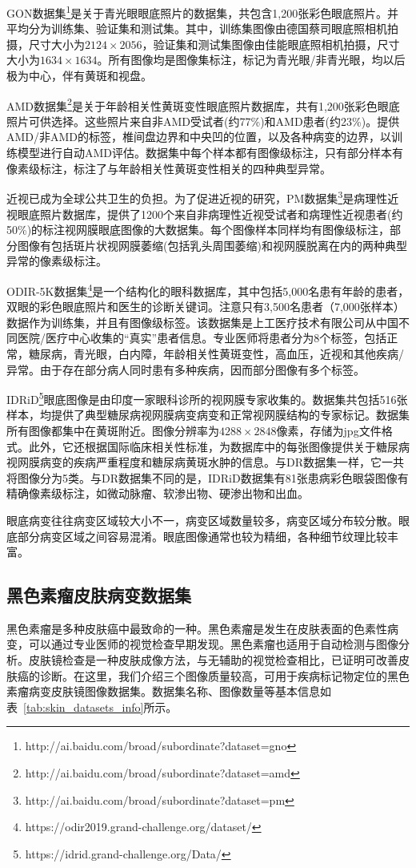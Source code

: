 GON数据集\footnote{http://ai.baidu.com/broad/subordinate?dataset=gno}是关于青光眼眼底照片的数据集，共包含1,200张彩色眼底照片。并平均分为训练集、验证集和测试集。其中，训练集图像由德国蔡司眼底照相机拍摄，尺寸大小为$2124\times 2056$，验证集和测试集图像由佳能眼底照相机拍摄，尺寸大小为$1634\times 1634 $。所有图像均是图像集标注，标记为青光眼/非青光眼，均以后极为中心，伴有黄斑和视盘。

AMD数据集\footnote{http://ai.baidu.com/broad/subordinate?dataset=amd}是关于年龄相关性黄斑变性眼底照片数据库，共有1,200张彩色眼底照片可供选择。这些照片来自非AMD受试者(约77\%)和AMD患者(约23\%)。提供AMD/非AMD的标签，椎间盘边界和中央凹的位置，以及各种病变的边界，以训练模型进行自动AMD评估。数据集中每个样本都有图像级标注，只有部分样本有像素级标注，标注了与年龄相关性黄斑变性相关的四种典型异常。

近视已成为全球公共卫生的负担。为了促进近视的研究，PM数据集\footnote{http://ai.baidu.com/broad/subordinate?dataset=pm}是病理性近视眼底照片数据库，提供了1200个来自非病理性近视受试者和病理性近视患者(约50\%)的标注视网膜眼底图像的大数据集。每个图像样本同样均有图像级标注，部分图像有包括斑片状视网膜萎缩(包括乳头周围萎缩)和视网膜脱离在内的两种典型异常的像素级标注。

ODIR-5K数据集\footnote{https://odir2019.grand-challenge.org/dataset/}是一个结构化的眼科数据库，其中包括5,000名患有年龄的患者，双眼的彩色眼底照片和医生的诊断关键词。注意只有3,500名患者（7,000张样本）数据作为训练集，并且有图像级标签。该数据集是上工医疗技术有限公司从中国不同医院/医疗中心收集的“真实”患者信息。专业医师将患者分为8个标签，包括正常，糖尿病，青光眼，白内障，年龄相关性黄斑变性，高血压，近视和其他疾病/异常。由于存在部分病人同时患有多种疾病，因而部分图像有多个标签。

IDRiD\footnote{https://idrid.grand-challenge.org/Data/}眼底图像是由印度一家眼科诊所的视网膜专家收集的。数据集共包括516张样本，均提供了典型糖尿病视网膜病变病变和正常视网膜结构的专家标记。数据集所有图像都集中在黄斑附近。图像分辨率为$4288\times 2848$像素，存储为jpg文件格式。此外，它还根据国际临床相关性标准，为数据库中的每张图像提供关于糖尿病视网膜病变的疾病严重程度和糖尿病黄斑水肿的信息。与DR数据集一样，它一共将图像分为5类。与DR数据集不同的是，IDRiD数据集有81张患病彩色眼袋图像有精确像素级标注，如微动脉瘤、软渗出物、硬渗出物和出血。

眼底病变往往病变区域较大小不一，病变区域数量较多，病变区域分布较分散。眼底部分病变区域之间容易混淆。眼底图像通常也较为精细，各种细节纹理比较丰富。


\subsection{黑色素瘤皮肤病变数据集}\label{subsec:original_dermatoscope_ds_intro}
黑色素瘤是多种皮肤癌中最致命的一种。黑色素瘤是发生在皮肤表面的色素性病变，可以通过专业医师的视觉检查早期发现。黑色素瘤也适用于自动检测与图像分析。皮肤镜检查是一种皮肤成像方法，与无辅助的视觉检查相比，已证明可改善皮肤癌的诊断。在这里，我们介绍三个图像质量较高，可用于疾病标记物定位的黑色素瘤病变皮肤镜图像数据集。数据集名称、图像数量等基本信息如表~\ref{tab:skin_datasets_info}所示。

